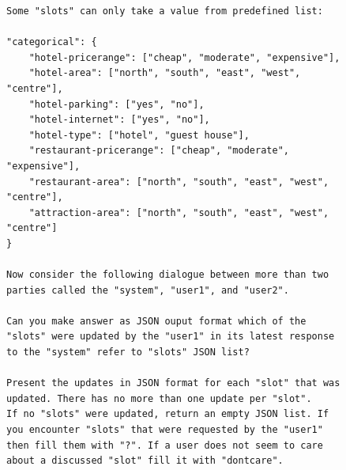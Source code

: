 \begin{figure}[h]
\begin{lstlisting}
Some "slots" can only take a value from predefined list:

"categorical": {
    "hotel-pricerange": ["cheap", "moderate", "expensive"],
    "hotel-area": ["north", "south", "east", "west", "centre"],
    "hotel-parking": ["yes", "no"],
    "hotel-internet": ["yes", "no"],
    "hotel-type": ["hotel", "guest house"],
    "restaurant-pricerange": ["cheap", "moderate", "expensive"],
    "restaurant-area": ["north", "south", "east", "west", "centre"],
    "attraction-area": ["north", "south", "east", "west", "centre"]
}

Now consider the following dialogue between more than two parties called the "system", "user1", and "user2".

Can you make answer as JSON ouput format which of the "slots" were updated by the "user1" in its latest response to the "system" refer to "slots" JSON list?

Present the updates in JSON format for each "slot" that was updated. There has no more than one update per "slot".
If no "slots" were updated, return an empty JSON list. If you encounter "slots" that were requested by the "user1" then fill them with "?". If a user does not seem to care about a discussed "slot" fill it with "dontcare".

\end{lstlisting}
\end{figure}




